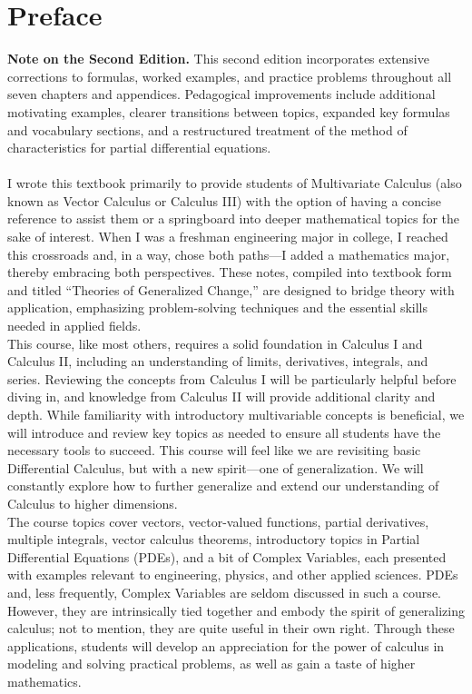 \chapter*{Preface}

\noindent \textbf{Note on the Second Edition.} This second edition incorporates extensive corrections to formulas, worked examples, and practice problems throughout all seven chapters and appendices. Pedagogical improvements include additional motivating examples, clearer transitions between topics, expanded key formulas and vocabulary sections, and a restructured treatment of the method of characteristics for partial differential equations.\\ \\

\noindent I wrote this textbook primarily to provide students of Multivariate Calculus (also known as Vector Calculus or Calculus III) with the option of having a concise reference to assist them or a springboard into deeper mathematical topics for the sake of interest. When I was a freshman engineering major in college, I reached this crossroads and, in a way, chose both paths—I added a mathematics major, thereby embracing both perspectives. These notes, compiled into textbook form and titled ``Theories of Generalized Change,'' are designed to bridge theory with application, emphasizing problem-solving techniques and the essential skills needed in applied fields. \\

\noindent This course, like most others, requires a solid foundation in Calculus I and Calculus II, including an understanding of limits, derivatives, integrals, and series. Reviewing the concepts from Calculus I will be particularly helpful before diving in, and knowledge from Calculus II will provide additional clarity and depth. While familiarity with introductory multivariable concepts is beneficial, we will introduce and review key topics as needed to ensure all students have the necessary tools to succeed. This course will feel like we are revisiting basic Differential Calculus, but with a new spirit—one of generalization. We will constantly explore how to further generalize and extend our understanding of Calculus to higher dimensions. \\

\noindent The course topics cover vectors, vector-valued functions, partial derivatives, multiple integrals, vector calculus theorems, introductory topics in Partial Differential Equations (PDEs), and a bit of Complex Variables, each presented with examples relevant to engineering, physics, and other applied sciences. PDEs and, less frequently, Complex Variables are seldom discussed in such a course. However, they are intrinsically tied together and embody the spirit of generalizing calculus; not to mention, they are quite useful in their own right. Through these applications, students will develop an appreciation for the power of calculus in modeling and solving practical problems, as well as gain a taste of higher mathematics. \\

